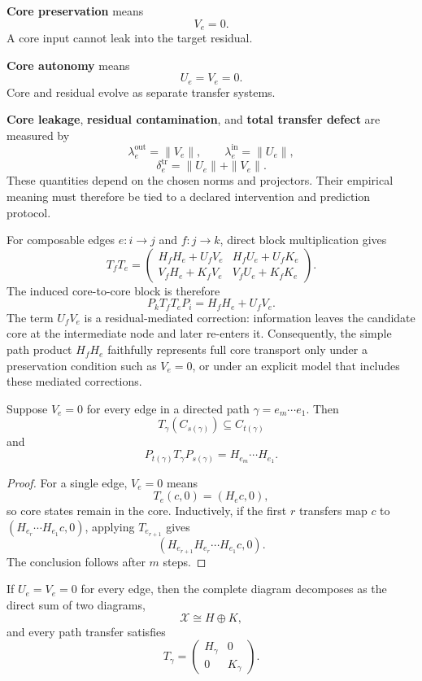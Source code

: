 
\textbf{Core preservation} means
\[
V_e=0.
\]
A core input cannot leak into the target residual.

\textbf{Core autonomy} means
\[
U_e=V_e=0.
\]
Core and residual evolve as separate transfer systems.

\textbf{Core leakage}, \textbf{residual contamination}, and \textbf{total
transfer defect} are measured by
\[
\lambda_e^{\mathrm{out}}=\|V_e\|,
\qquad
\lambda_e^{\mathrm{in}}=\|U_e\|,
\]
\[
\delta_e^{\mathrm{tr}}
=
\|U_e\|+\|V_e\|.
\]
These quantities depend on the chosen norms and projectors. Their empirical
meaning must therefore be tied to a declared intervention and prediction
protocol.


For composable edges \(e:i\to j\) and \(f:j\to k\), direct block
multiplication gives
\[
T_fT_e
=
\begin{pmatrix}
H_fH_e+U_fV_e & H_fU_e+U_fK_e\\
V_fH_e+K_fV_e & V_fU_e+K_fK_e
\end{pmatrix}.
\]
The induced core-to-core block is therefore
\[
P_kT_fT_eP_i
=
H_fH_e+U_fV_e.
\]
The term \(U_fV_e\) is a residual-mediated correction: information leaves the
candidate core at the intermediate node and later re-enters it. Consequently,
the simple path product \(H_fH_e\) faithfully represents full core transport
only under a preservation condition such as \(V_e=0\), or under an explicit
model that includes these mediated corrections.

\begin{proposition}\label{prop:pathwise-preservation}
Suppose \(V_e=0\) for every edge in a directed path
\(\gamma=e_m\cdots e_1\). Then
\[
T_\gamma(C_{s(\gamma)})\subseteq C_{t(\gamma)}
\]
and
\[
P_{t(\gamma)}T_\gamma P_{s(\gamma)}
=
H_{e_m}\cdots H_{e_1}.
\]
\end{proposition}

\begin{proof}
For a single edge, \(V_e=0\) means
\[
T_e(c,0)=(H_ec,0),
\]
so core states remain in the core. Inductively, if the first \(r\) transfers
map \(c\) to \((H_{e_r}\cdots H_{e_1}c,0)\), applying \(T_{e_{r+1}}\) gives
\[
(H_{e_{r+1}}H_{e_r}\cdots H_{e_1}c,0).
\]
The conclusion follows after \(m\) steps.
\end{proof}

\begin{corollary}\label{cor:autonomous-splitting}
If \(U_e=V_e=0\) for every edge, then the complete diagram decomposes as the
direct sum of two diagrams,
\[
\mathcal X\cong H\oplus K,
\]
and every path transfer satisfies
\[
T_\gamma
=
\begin{pmatrix}
H_\gamma&0\\
0&K_\gamma
\end{pmatrix}.
\]
\end{corollary}

